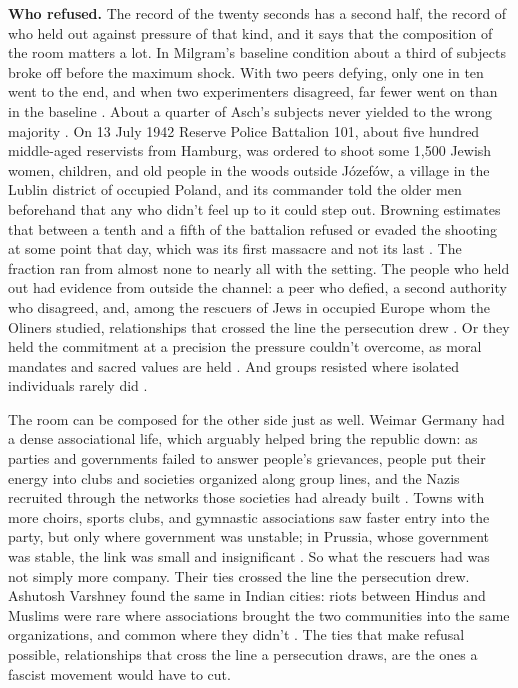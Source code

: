 \textbf{Who refused.} The record of the twenty seconds has a second half, the record of who held out against pressure of that kind, and it says that the composition of the room matters a lot. In Milgram's baseline condition about a third of subjects broke off before the maximum shock. With two peers defying, only one in ten went to the end, and when two experimenters disagreed, far fewer went on than in the baseline \autocite{milgram1974obedience}. About a quarter of Asch's subjects never yielded to the wrong majority \autocite{asch1956studies}. On 13 July 1942 Reserve Police Battalion 101, about five hundred middle-aged reservists from Hamburg, was ordered to shoot some 1,500 Jewish women, children, and old people in the woods outside Józefów, a village in the Lublin district of occupied Poland, and its commander told the older men beforehand that any who didn't feel up to it could step out. Browning estimates that between a tenth and a fifth of the battalion refused or evaded the shooting at some point that day, which was its first massacre and not its last \autocite{browning1992ordinary}. The fraction ran from almost none to nearly all with the setting. The people who held out had evidence from outside the channel: a peer who defied, a second authority who disagreed, and, among the rescuers of Jews in occupied Europe whom the Oliners studied, relationships that crossed the line the persecution drew \autocite{oliner1988altruistic}. Or they held the commitment at a precision the pressure couldn't overcome, as moral mandates and sacred values are held \autocite{skitka2009limits,ginges2007sacred}. And groups resisted where isolated individuals rarely did \autocite{gamson1982encounters}.

The room can be composed for the other side just as well. Weimar Germany had a dense associational life, which arguably helped bring the republic down: as parties and governments failed to answer people's grievances, people put their energy into clubs and societies organized along group lines, and the Nazis recruited through the networks those societies had already built \autocite{berman1997weimar}. Towns with more choirs, sports clubs, and gymnastic associations saw faster entry into the party, but only where government was unstable; in Prussia, whose government was stable, the link was small and insignificant \autocite{satyanath2017bowling}. So what the rescuers had was not simply more company. Their ties crossed the line the persecution drew. Ashutosh Varshney found the same in Indian cities: riots between Hindus and Muslims were rare where associations brought the two communities into the same organizations, and common where they didn't \autocite{varshney2002ethnic}. The ties that make refusal possible, relationships that cross the line a persecution draws, are the ones a fascist movement would have to cut.

